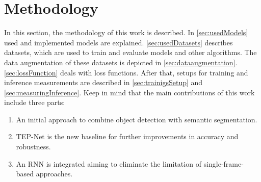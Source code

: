 \chapter{Methodology}
\label{sec:methodology}


In this section, the methodology of this work is described.
In \autoref{sec:usedModels} used and implemented models are explained.
\autoref{sec:usedDatasets} describes datasets, which are used to train and evaluate models and other algorithms.
The data augmentation of these datasets is depicted in \autoref{sec:dataaugmentation}.
\autoref{sec:lossFunction} deals with loss functions.
After that, setups for training and inference measurements are described in \autoref{sec:trainigsSetup} and \autoref{sec:measuringInference}.
Keep in mind that the main contributions of this work include three parts:

\begin{enumerate}
    \item An initial approach to combine object detection with semantic segmentation.
    \item TEP-Net \cite{tepNet2024} is the new baseline for further improvements in accuracy and robustness.
    \item An RNN is integrated aiming to eliminate the limitation of single-frame-based approaches.
\end{enumerate}









